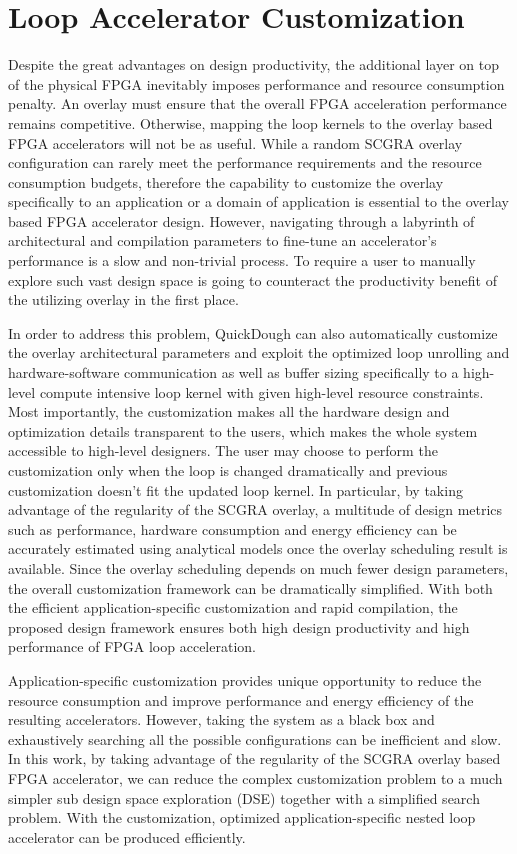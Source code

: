 \chapter{Loop Accelerator Customization} \label{chapter:customization}
Despite the great advantages on design productivity, the additional layer on top of the physical FPGA inevitably imposes performance and resource consumption penalty. An overlay must ensure that the overall FPGA acceleration performance remains competitive. Otherwise, mapping the loop kernels to the overlay based FPGA accelerators will not be as useful. While a random SCGRA overlay configuration can rarely meet the performance requirements and the resource consumption budgets, therefore the capability to customize the overlay specifically to an application or a domain of application is essential to the overlay based FPGA accelerator design. However, navigating through a labyrinth of architectural and compilation parameters to fine-tune an accelerator's performance is a slow and non-trivial process. To require a user to manually explore such vast design space is going to counteract the productivity benefit of the utilizing overlay in the first place.

In order to address this problem, QuickDough can also automatically customize the overlay architectural parameters and exploit the optimized loop unrolling and hardware-software communication as well as buffer sizing specifically to a high-level compute intensive loop kernel with given high-level resource constraints. Most importantly, the customization makes all the hardware design and optimization details transparent to the users, which makes the whole system accessible to high-level designers. The user may choose to perform the customization only when the loop is changed dramatically and previous customization doesn't fit the updated loop kernel. In particular, by taking advantage of the regularity of the SCGRA overlay, a multitude of design metrics such as performance, hardware consumption and energy efficiency can be accurately estimated using analytical models once the overlay scheduling result is available. Since the overlay scheduling depends on much fewer design parameters, the overall customization framework can be dramatically simplified. With both the efficient application-specific customization and rapid compilation, the proposed design framework ensures both high design productivity and high performance of FPGA loop acceleration.

Application-specific customization provides unique opportunity to reduce the resource consumption and improve performance and energy efficiency of the resulting accelerators. However, taking the system as a black box and exhaustively searching all the possible configurations can be inefficient and slow. In this work, by taking advantage of the regularity of the SCGRA overlay based FPGA accelerator, we can reduce the complex customization problem to a much simpler sub design space exploration (DSE) together with a simplified search problem. With the customization, optimized application-specific nested loop accelerator can be produced efficiently.

